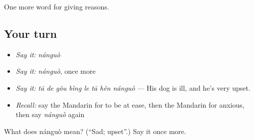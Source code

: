 \begin{grammarlens}[title={What you've built}]
One more word for giving reasons.
\end{grammarlens}

\subsection*{Your turn}
\begin{itemize}
\raggedright
  \item \emph{Say it:} \emph{nánguò}
  \item \emph{Say it:} \emph{nánguò}, once more
  \item \emph{Say it:} \emph{tā de gǒu bìng le tā hěn nánguò} — His dog is ill, and he's very upset.
  \item \emph{Recall:} say the Mandarin for to be at ease, then the Mandarin for anxious, then say \emph{nánguò} again
\end{itemize}

\begin{tcolorbox}[breakable,colback=teal!4,colframe=teal!35!black,title={Before you move on}]
What does nánguò mean? (\textquotedblleft{}Sad; upset\textquotedblright{}.) Say it once more.
\end{tcolorbox}
